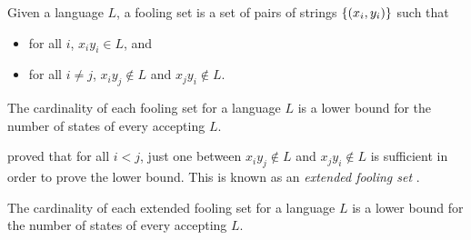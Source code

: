 \begin{defn}
	Given a language $L$, a fooling set is a set of pairs of strings $\{(x_i,y_i)\}$ such that
	\begin{itemize}
		\item for all $i$, $x_iy_i\in L$, and
		\item for all $i\ne j$, $x_iy_j\notin L$ and $x_jy_i\notin L$.
	\end{itemize}
\end{defn}
\begin{thrm}
	The cardinality of each fooling set for a language $L$ is a lower bound for the number of states of every \ONFA accepting $L$.
\end{thrm}

\citeauthor{Bir92} proved that for all $i<j$, just one between $x_iy_j\notin L$ and $x_jy_i\notin L$ is sufficient in order to prove the lower bound.
This is known as an \emph{extended fooling set} \cite{Bir92}.
\begin{thrm}
	The cardinality of each extended fooling set for a language $L$ is a lower bound for the number of states of every \ONFA accepting $L$.
\end{thrm}
